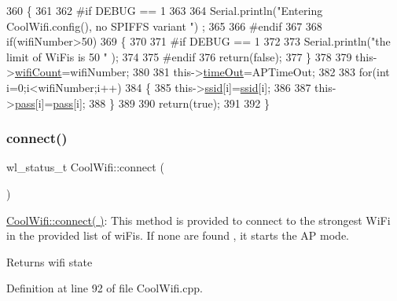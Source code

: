 \begin{DoxyCode}
360 \{
361 
362 \textcolor{preprocessor}{#if DEBUG == 1 }
363     
364     Serial.println(\textcolor{stringliteral}{"Entering CoolWifi.config(), no SPIFFS variant "}) ;
365     
366 \textcolor{preprocessor}{#endif}
367     
368     \textcolor{keywordflow}{if}(wifiNumber>50)
369     \{
370     
371 \textcolor{preprocessor}{    #if DEBUG == 1 }
372         
373         Serial.println(\textcolor{stringliteral}{"the limit of WiFis is 50 "} );
374         
375 \textcolor{preprocessor}{    #endif}
376         \textcolor{keywordflow}{return}(\textcolor{keyword}{false});  
377     \}
378 
379     this->\hyperlink{classCoolWifi_ab133bd92fcb895b884deecd6678592e4}{wifiCount}=wifiNumber;
380 
381     this->\hyperlink{classCoolWifi_a952111605f25156588b5632caaba1c6f}{timeOut}=APTimeOut;
382     
383     \textcolor{keywordflow}{for}(\textcolor{keywordtype}{int} i=0;i<wifiNumber;i++)
384     \{
385         this->\hyperlink{classCoolWifi_a893b21d0fed821438733bba2e73fb4c2}{ssid}[i]=\hyperlink{classCoolWifi_a893b21d0fed821438733bba2e73fb4c2}{ssid}[i];
386         
387         this->\hyperlink{classCoolWifi_a0c3332a149245aaad060b32593a54c9b}{pass}[i]=\hyperlink{classCoolWifi_a0c3332a149245aaad060b32593a54c9b}{pass}[i];
388     \}
389         
390     \textcolor{keywordflow}{return}(\textcolor{keyword}{true});
391 
392 \}
\end{DoxyCode}
\mbox{\label{classCoolWifi_ad060353050f40d032a2dbf9e54a768bf}} 
\subsubsection{\texorpdfstring{connect()}{connect()}}
{\footnotesize\ttfamily wl\+\_\+status\+\_\+t Cool\+Wifi\+::connect (\begin{DoxyParamCaption}{ }\end{DoxyParamCaption})}

\hyperlink{classCoolWifi_ad060353050f40d032a2dbf9e54a768bf}{Cool\+Wifi\+::connect( )}\+: This method is provided to connect to the strongest Wi\+Fi in the provided list of wi\+Fis. If none are found , it starts the AP mode.

\begin{DoxyReturn}{Returns}
wifi state 
\end{DoxyReturn}


Definition at line 92 of file Cool\+Wifi.\+cpp.




